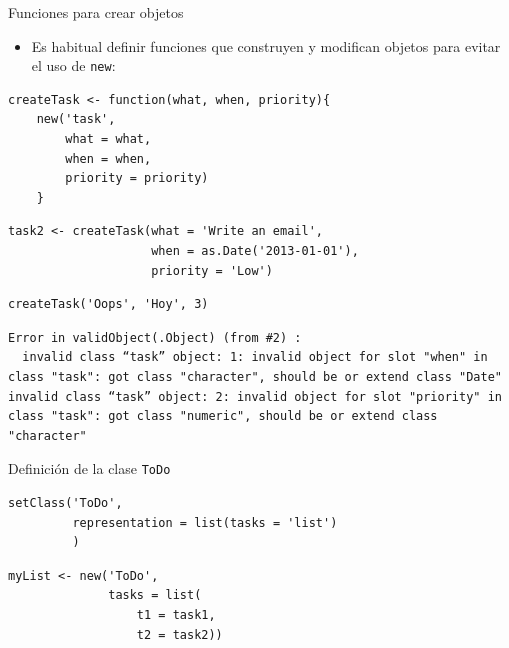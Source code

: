 \documentclass[xcolor={usenames,svgnames,dvipsnames}]{beamer}
\begin{document}
\begin{frame}[fragile,label={sec:orgheadline24}]{Funciones para crear objetos}
 \begin{itemize}
\item Es habitual definir funciones que construyen y modifican objetos
para evitar el uso de \texttt{new}:
\end{itemize}
\lstset{language=R,label= ,caption= ,captionpos=b,numbers=none}
\begin{lstlisting}
createTask <- function(what, when, priority){
    new('task',
        what = what,
        when = when,
        priority = priority)
    }
\end{lstlisting}

\lstset{language=R,label= ,caption= ,captionpos=b,numbers=none}
\begin{lstlisting}
task2 <- createTask(what = 'Write an email',
                    when = as.Date('2013-01-01'),
                    priority = 'Low')
\end{lstlisting}

\lstset{language=R,label= ,caption= ,captionpos=b,numbers=none}
\begin{lstlisting}
createTask('Oops', 'Hoy', 3)
\end{lstlisting}

\begin{verbatim}
Error in validObject(.Object) (from #2) : 
  invalid class “task” object: 1: invalid object for slot "when" in class "task": got class "character", should be or extend class "Date"
invalid class “task” object: 2: invalid object for slot "priority" in class "task": got class "numeric", should be or extend class "character"
\end{verbatim}
\end{frame}

\begin{frame}[fragile,label={sec:orgheadline25}]{Definición de la clase \texttt{ToDo}}
 \lstset{language=R,label= ,caption= ,captionpos=b,numbers=none}
\begin{lstlisting}
setClass('ToDo',
         representation = list(tasks = 'list')
         )
\end{lstlisting}

\lstset{language=R,label= ,caption= ,captionpos=b,numbers=none}
\begin{lstlisting}
myList <- new('ToDo',
              tasks = list(
                  t1 = task1,
                  t2 = task2))
\end{lstlisting}
\end{frame}
\end{document}
